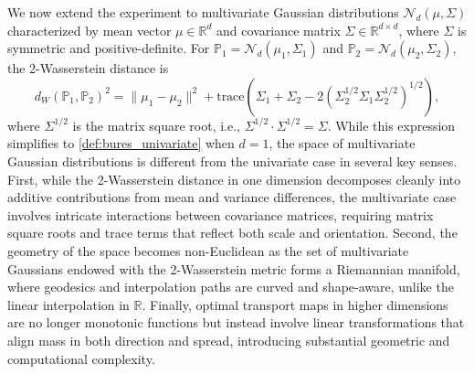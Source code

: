 \documentclass[10pt]{article}
\newcommand{\bbP}{\mathbb{P}}
\newcommand{\bbR}{\mathbb{R}}
\newcommand{\calN}{\mathcal{N}}
\begin{document}
We now extend the experiment to multivariate Gaussian distributions $\calN_d(\mu,\Sigma)$ characterized by mean vector $\mu \in \bbR^d$ and covariance matrix $\Sigma \in \bbR^{d \times d}$, where $\Sigma$ is symmetric and positive-definite. For $\bbP_1 = \calN_d(\mu_1, \Sigma_1)$ and $\bbP_2 = \calN_d(\mu_2, \Sigma_2)$, the 2-Wasserstein distance is
\begin{equation}\label{def:bures_multivariate}
d_W (\bbP_1, \bbP_2)^2 = \|\mu_1 - \mu_2\|^2 + \text{trace}\left(\Sigma_1 + \Sigma_2 - 2(\Sigma_2^{1/2}\Sigma_1\Sigma_2^{1/2})^{1/2}\right),
\end{equation}
where $\Sigma^{1/2}$ is the matrix square root, i.e., $\Sigma^{1/2}\cdot \Sigma^{1/2} = \Sigma$. While this expression simplifies to  \eqref{def:bures_univariate} when $d=1$, the space of multivariate Gaussian distributions is different from the univariate case in several key senses. First, while the 2-Wasserstein distance in one dimension decomposes cleanly into additive contributions from mean and variance differences, the multivariate case involves intricate interactions between covariance matrices, requiring matrix square roots and trace terms that reflect both scale and orientation. Second, the geometry of the space becomes non-Euclidean as the set of multivariate Gaussians endowed with the 2-Wasserstein metric forms a Riemannian manifold, where geodesics and interpolation paths are curved and shape-aware, unlike the linear interpolation in $\bbR$. Finally, optimal transport maps in higher dimensions are no longer monotonic functions but instead involve linear transformations that align mass in both direction and spread, introducing substantial geometric and computational complexity.
\end{document}
